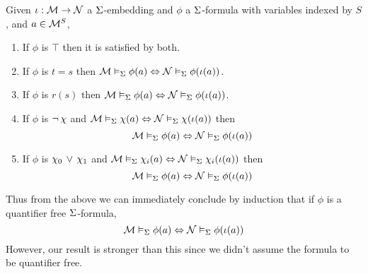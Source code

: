 \begin{prop}
    Given $\iota : \mathcal{M} \to \mathcal{N}$ a $\Sigma$-embedding and
    $\phi$ a $\Sigma$-formula with variables indexed by $S$,
    and $a \in \mathcal{M}^S$,
    \begin{enumerate}
        \item If $\phi$ is $\top$ then it is satisfied by both.
        \item If $\phi$ is $t = s$ then 
            $\mathcal{M} \vDash_{\Sigma} \phi(a)  \Leftrightarrow \mathcal{N} \vDash_{\Sigma} \phi(\iota(a))$.
        \item If $\phi$ is $r(s)$ then 
            $\mathcal{M} \vDash_{\Sigma} \phi(a)  \Leftrightarrow \mathcal{N} \vDash_{\Sigma} \phi(\iota(a))$.
        \item If $\phi$ is $\neg\, \chi$ and 
            $\mathcal{M} \vDash_{\Sigma} \chi(a)  \Leftrightarrow \mathcal{N} \vDash_{\Sigma} \chi(\iota(a))$
            then \[\mathcal{M} \vDash_{\Sigma} \phi(a)  \Leftrightarrow \mathcal{N} \vDash_{\Sigma} \phi(\iota(a))\]
        \item If $\phi$ is $\chi_0 \, \lor \, \chi_1$ and 
            $\mathcal{M} \vDash_{\Sigma} \chi_i (a)  \Leftrightarrow \mathcal{N} \vDash_{\Sigma} \chi_i (\iota(a))$
            then \[\mathcal{M} \vDash_{\Sigma} \phi(a)  \Leftrightarrow \mathcal{N} \vDash_{\Sigma} \phi(\iota(a))\]
    \end{enumerate}
    Thus from the above we can immediately conclude by induction
    that if $\phi$ is a quantifier free $\Sigma$-formula, 
    \[\mathcal{M} \vDash_{\Sigma} \phi(a)  \Leftrightarrow \mathcal{N} \vDash_{\Sigma} \phi(\iota(a))\]
    However, our result is stronger than this since we didn't
    assume the formula to be quantifier free.
\end{prop}
